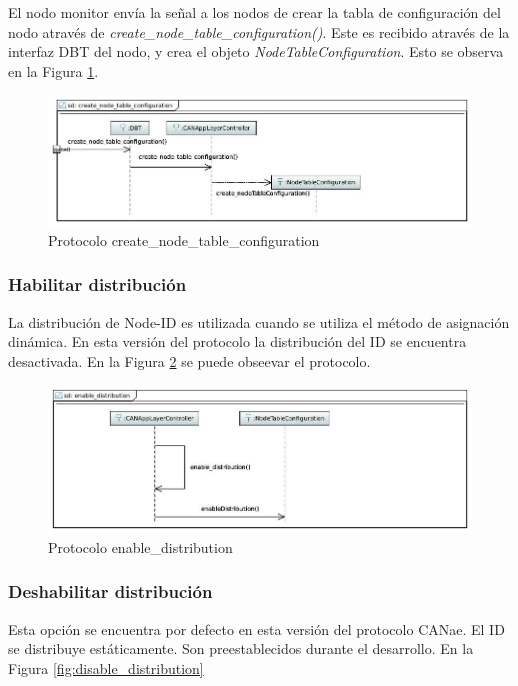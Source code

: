El nodo monitor envía la señal a los nodos de crear la tabla de configuración
del nodo através de \textit{create\_node\_table\_configuration()}. Este es
recibido através de la interfaz DBT del nodo, y crea el objeto
\textit{NodeTableConfiguration}. Esto se observa en la Figura
\ref{fig:createNodeTableConfiguration}.

\begin{figure}[h!]
 \centering
 \includegraphics[scale=0.4]{images/Secciones/AppendixA/create_node_table_configuration.JPG}
  \caption{Protocolo create\_node\_table\_configuration}
\label{fig:createNodeTableConfiguration}
\end{figure} 

\subsubsection{Habilitar distribución}
La distribución de Node-ID es utilizada cuando se utiliza el método de
asignación dinámica. En esta versión del protocolo la distribución del ID se
encuentra desactivada. En la Figura \ref{fig:enable_distribution} se puede
obseevar el protocolo.

\begin{figure}[h!]
 \centering
 \includegraphics[scale=0.4]{images/Secciones/AppendixA/enableDistribution.JPG}
  \caption{Protocolo enable\_distribution}
\label{fig:enable_distribution}
\end{figure}

\subsubsection{Deshabilitar distribución}
Esta opción se encuentra por defecto en esta versión del protocolo CANae. El ID
se distribuye estáticamente. Son preestablecidos durante el desarrollo. En la
Figura \ref{fig:disable_distribution}

